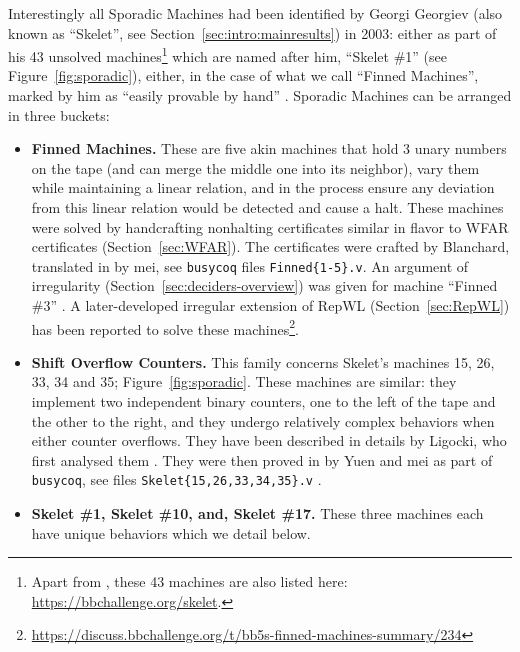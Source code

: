 Interestingly all Sporadic Machines had been identified by Georgi Georgiev (also known as ``Skelet'', see Section~\ref{sec:intro:mainresults}) in 2003: either as part of his 43 unsolved machines\footnote{Apart from \cite{Skelet_bbfind_list}, these 43 machines are also listed here: \url{https://bbchallenge.org/skelet}.} which are named after him, \eg ``Skelet \#1'' (see Figure~\ref{fig:sporadic}), either, in the case of what we call ``Finned Machines'', marked by him as ``easily provable by hand'' \cite{Skelet_bbfind_list}. Sporadic Machines can be arranged in three buckets:
\begin{itemize}
    \item \textbf{Finned Machines.} These are five akin machines that hold 3 unary numbers on the tape (and can merge the middle one into its neighbor), vary them while maintaining a linear relation, and in the process ensure any deviation from this linear relation would be detected and cause a halt. These machines were solved by handcrafting nonhalting certificates similar in flavor to WFAR certificates (Section~\ref{sec:WFAR}). The certificates were crafted by Blanchard, translated in \Coq by mei, see \texttt{busycoq} files \texttt{Finned\{1-5\}.v}. An argument of irregularity (Section~\ref{sec:deciders-overview}) was given for machine ``Finned \#3'' \cite{irregularFinned3}. A later-developed irregular extension of RepWL (Section~\ref{sec:RepWL}) has been reported to solve these machines\footnote{\url{https://discuss.bbchallenge.org/t/bb5s-finned-machines-summary/234}}.
    \item \textbf{Shift Overflow Counters.} This family concerns Skelet's machines 15, 26, 33, 34 and 35; Figure~\ref{fig:sporadic}. These machines are similar: they implement two independent binary counters, one to the left of the tape and the other to the right, and they undergo relatively complex behaviors when either counter overflows. They have been described in details by Ligocki, who first analysed them \cite{ShawnSOC}. They were then proved in \Coq by Yuen and mei as part of \texttt{busycoq}, see files \texttt{Skelet\{15,26,33,34,35\}.v} \cite{busycoq}.
    \item \textbf{Skelet \#1, Skelet \#10, and, Skelet \#17.} These three machines each have unique behaviors which we detail below.
\end{itemize}

